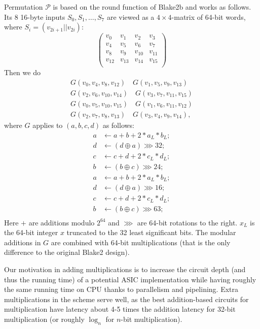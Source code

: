 \documentclass[a4paper]{article}
\begin{document}
Permutation $\mathcal{P}$  is based on the round function of Blake2b and works as follows. Its 8 16-byte inputs $S_0, S_1,\ldots, S_7$ are viewed as a $4\times 4$-matrix of 64-bit words, where $S_i = (v_{2i+1}||v_{2i})$:
$$
\begin{pmatrix}
  v_0 & v_1 & v_2 & v_3\\
    v_4 & v_5 & v_6 & v_7\\
      v_8 & v_9 & v_{10} & v_{11}\\
        v_{12} & v_{13} & v_{14} & v_{15}\\
\end{pmatrix}
$$
Then we do
\begin{eqnarray*}
G(v_0, v_4, v_8, v_{12})\quad G(v_1, v_5, v_9, v_{13}) \\ G(v_2, v_6, v_{10}, v_{14}) \quad G(v_3, v_7, v_{11}, v_{15})\\
G(v_0, v_5, v_{10}, v_{15})\quad G(v_1, v_6, v_{11}, v_{12}) \\ G(v_2, v_7, v_{8}, v_{13}) \quad G(v_3, v_4, v_{9}, v_{14}),
\end{eqnarray*}
where $G$  applies to $(a,b,c,d)$ as follows:
\begin{equation}\label{eq:blake-orig}
\begin{aligned}
  a &\leftarrow a + b+ 2*a_L*b_L;\\
  d &\leftarrow (d\oplus a)\ggg 32;\\
  c &\leftarrow c + d+ 2*c_L*d_L;\\
  b &\leftarrow (b\oplus c)\ggg 24;\\
    a &\leftarrow a + b+ 2*a_L*b_L;\\
  d &\leftarrow (d\oplus a)\ggg 16;\\
  c &\leftarrow c + d+ 2*c_L*d_L;\\
  b &\leftarrow (b\oplus c)\ggg 63;\\
\end{aligned}
\end{equation}
Here $+$ are additions modulo $2^{64}$ and $\ggg$ are 64-bit rotations to the right. $x_L$ is the 64-bit integer $x$ truncated to the 32 least significant bits. The modular additions in $G$ are combined with 64-bit multiplications (that is the only difference to the original Blake2 design). 


Our motivation in adding multiplications is to increase the circuit depth (and thus the running time) of a potential ASIC implementation while having roughly the same running time on CPU thanks to parallelism and pipelining. Extra multiplications in the scheme serve well, as the best addition-based circuits for multiplication have latency about 4-5 times the addition latency for 32-bit multiplication (or roughly $\log_n$ for $n$-bit multiplication).
\end{document}
